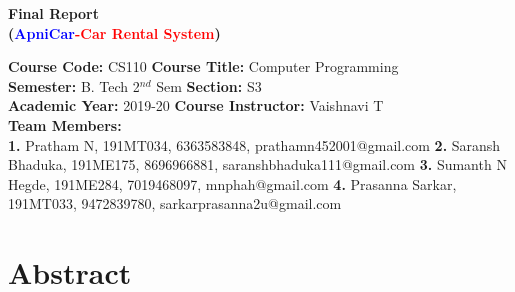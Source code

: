 \documentclass[12pt]{article}
\begin{document}




\begin{center}
    \textbf{\Large{Final Report \\
    (\textcolor{blue}{ApniCar}\textcolor{red}{-Car Rental System})}}
\end{center}

\noindent 
\textbf{Course Code:} CS110 
\hspace{2in} 
\textbf{Course Title:} Computer Programming \\
\textbf{Semester:} B. Tech 2$^{nd}$ Sem 
\hspace{1.6in} 
\textbf{Section:} S3 \\
\textbf{Academic Year:} 2019-20 
\hspace{1.8in} 
\textbf{Course Instructor:} Vaishnavi T \\
\textbf{Team Members:} \\
\textbf{1.} Pratham N, 191MT034, 6363583848, prathamn452001@gmail.com 
\newline
\textbf{2.} Saransh Bhaduka, 191ME175, 8696966881, saranshbhaduka111@gmail.com
\newline
\textbf{3.} Sumanth N Hegde, 191ME284, 7019468097, mnphah@gmail.com
\newline
\textbf{4.} Prasanna Sarkar, 191MT033, 9472839780, sarkarprasanna2u@gmail.com

\vspace{0.25in}

\section{Abstract}
\end{document}
